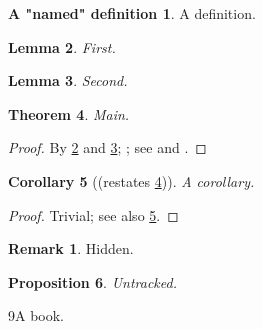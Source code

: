 \documentclass{article}
\newtheorem{theorem}{Theorem}
\newtheorem{lemma}[theorem]{Lemma}
\newtheorem{corollary}[theorem]{Corollary}
\newtheorem{proposition}[theorem]{Proposition}
\theoremstyle{definition}
\newtheorem{definition}[theorem]{A "named" definition}  %
\newtheorem*{remark}{Remark}                            %
\begin{document}
\begin{definition}\label{def:d}A definition.\end{definition}   %
\begin{lemma}\label{lem:a}First.\end{lemma}
\begin{lemma}\label{lem:b}Second.\end{lemma}

\begin{theorem}\label{thm:m}Main.\end{theorem}
\begin{proof}
  By \ref{lem:a} and \ref{lem:b}; ; see \cite[Ch.~1]{bk}
  and \cite{bk}.
\end{proof}

\begin{corollary}[(restates \ref{thm:m})]\label{cor:c}A corollary.\end{corollary}
\begin{proof}
  Trivial; see also \ref{cor:c}.        %
\end{proof}

\begin{remark}\label{rem:r}Hidden.\end{remark}            %
\begin{proposition}\label{prp:p}Untracked.\end{proposition}  %


\begin{thebibliography}{9}A book.\end{thebibliography}
\end{document}
